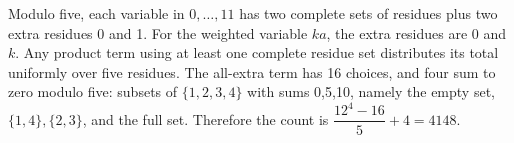 Modulo five, each variable in $0,\ldots,11$ has two complete sets of residues plus two extra residues 0 and 1. For the weighted variable $ka$, the extra residues are 0 and $k$. Any product term using at least one complete residue set distributes its total uniformly over five residues. The all-extra term has 16 choices, and four sum to zero modulo five: subsets of $\{1,2,3,4\}$ with sums 0,5,10, namely the empty set, $\{1,4\},\{2,3\}$, and the full set. Therefore the count is $\dfrac{12^4-16}{5}+4=\boxed{4148}$.
